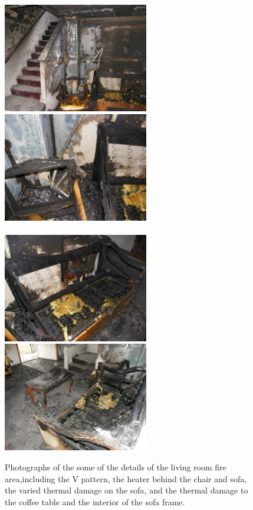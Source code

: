 \documentclass[twoside]{uocthesis}
\begin{document}
{\begin{figure}[ht!]
	\centering
		\includegraphics[width=2.5in]{../Figures/V_pattern}
		\includegraphics[width=2.5in]{../Figures/Heater}\\
		\hspace{3 mm}  \\
		\includegraphics[width=2.5in]{../Figures/Sofa}
		\includegraphics[width=2.5in]{../Figures/Table}\\
	\caption[Photographs of the some of the details of the living room fire area.]{Photographs of the some of the details of the living room fire area,including the V pattern, the heater behind the chair and sofa, the varied thermal damage on the sofa, and the thermal damage to the coffee table and the interior of the sofa frame.}
	\label{EXT_LRDetails}
\end{figure}

}
\end{document}
